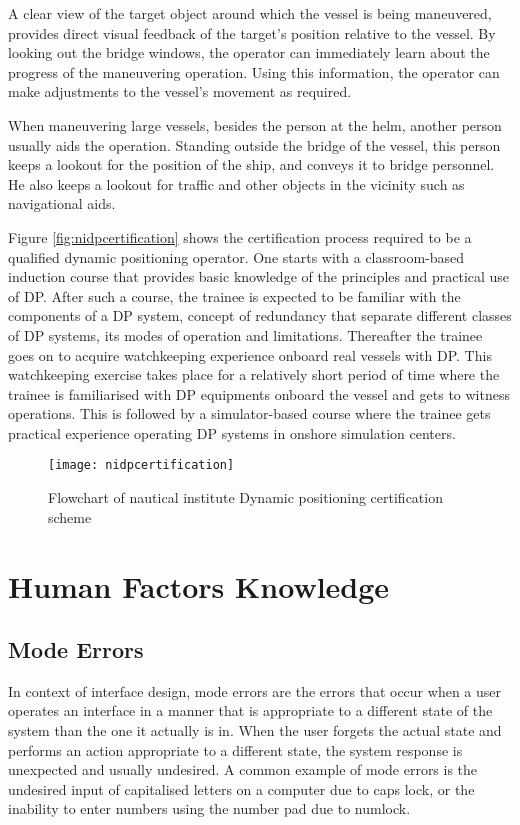 A clear view of the target object around which the vessel is being maneuvered, provides direct visual feedback of the target’s position relative to the vessel. By looking out the bridge windows, the operator can immediately learn about the progress of the maneuvering operation. Using this information, the operator can make adjustments to the vessel's movement as required.

When maneuvering large vessels, besides the person at the helm, another person usually aids the operation. Standing outside the bridge of the vessel, this person keeps a lookout for the position of the ship, and conveys it to bridge personnel. He also keeps a lookout for traffic and other objects in the vicinity such as navigational aids.

Figure \ref{fig:nidpcertification} shows the certification process required to be a qualified dynamic positioning operator. One starts with a classroom-based induction course that provides basic knowledge of the principles and practical use of DP. After such a course, the trainee is expected to be familiar with the components of a DP system, concept of redundancy that separate different classes of DP systems, its modes of operation and limitations. Thereafter the trainee goes on to acquire watchkeeping experience onboard real vessels with DP. This watchkeeping exercise takes place for a relatively short period of time where the trainee is familiarised with DP equipments onboard the vessel and gets to witness operations. This is followed by a simulator-based course where the trainee gets practical experience operating DP systems in onshore simulation centers. 

\begin{figure}
	\centering
	\texttt{[image: nidpcertification]}
	\caption{Flowchart of nautical institute Dynamic positioning certification scheme}
	\label{fig:dpoflowchart}
\end{figure} 

\section{Human Factors Knowledge}
\subsection{Mode Errors}
In context of interface design, mode errors are the errors that occur when a user operates an interface in a manner that is appropriate to a different state of the system than the one it actually is in. When the user forgets the actual state and performs an action appropriate to a different state, the system response is unexpected and usually undesired. A common example of mode errors is the undesired input of capitalised letters on a computer due to caps lock, or the inability to enter numbers using the number pad due to numlock. 

